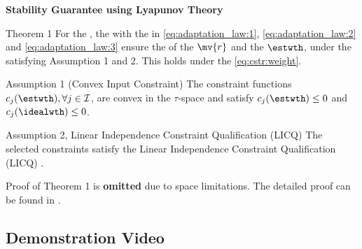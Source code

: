 \begin{frame}{\insertsubsectionhead}{}

    \textbf{Stability Guarantee using Lyapunov Theory}

  \centering
  \begin{minipage}{.9\textwidth}

    \begin{block}{Theorem 1 \cite{Ryu:2025aa}}
      For the , the  with the  in \eqref{eq:adaptation_law:1}, \eqref{eq:adaptation_law:2} and \eqref{eq:adaptation_law:3} ensure the  of the  $\mv{r}$ and the  $\estwth$, under the  satisfying Assumption 1 and 2. This holds under the  \eqref{eq:cstr:weight}.
    \end{block}

    \begin{exampleblock}{Assumption 1 (Convex Input Constraint)}
      The constraint functions $c_j(\estwth),\forall j\in\mathcal{I}$, are convex in the $\tau$-space and satisfy $c_j(\estwth)\le0$ and $c_j(\idealwth)\le0$.
    \end{exampleblock}

    \begin{exampleblock}{Assumption 2, Linear Independence Constraint Qualification (LICQ)}
      The selected constraints satisfy the Linear Independence Constraint Qualification (LICQ) \cite[Chap. 12 Def. 12.1]{Nocedal:2006aa}.
    \end{exampleblock}

  \end{minipage}

  \vspace{.2cm}

  Proof of Theorem 1 is \textbf{omitted } due to space limitations. The detailed proof can be found in \cite{Ryu:2025aa}.

\end{frame}

\subsection{Demonstration Video}

